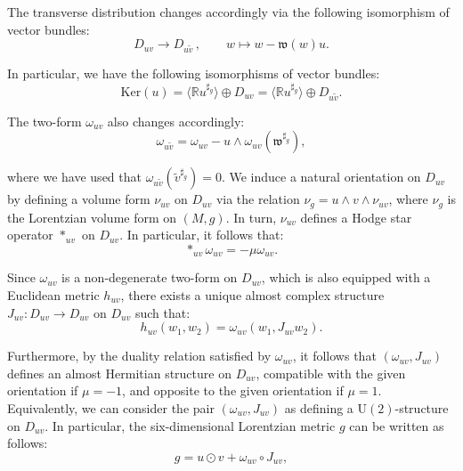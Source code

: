 \documentclass[10pt,a4paper,twoside,reqno]{amsart}
\theoremstyle{plain}
\theoremstyle{definition}
\theoremstyle{remark}
\def\U{\mathrm{U}}
\begin{document}
\noindent
The transverse distribution changes accordingly via the following isomorphism of vector bundles:
\begin{equation*}
D_{uv} \to D_{u\tilde{v}} \, , \qquad w \mapsto w - \mathfrak{w}(w) u.
\end{equation*}

\noindent
In particular, we have the following isomorphisms of vector bundles: 
\begin{equation*}
\mathrm{Ker}(u) =  \langle \mathbb{R} u^{\sharp_g} \rangle \oplus D_{uv} =  \langle \mathbb{R} u^{\sharp_g} \rangle \oplus D_{u\tilde{v}}.
\end{equation*}

\noindent
The two-form $\omega_{uv}$ also changes accordingly: 
\begin{equation*}
\omega_{u\tilde{v}} =\omega_{uv} -u\wedge\omega_{uv}(\mathfrak{w}^{\sharp_g}),
\end{equation*}

\noindent
where we have used that $\omega_{u\tilde{v}}(\tilde{v}^{\sharp_g})=0$. We induce a natural orientation on $D_{uv}$ by defining a volume form $\nu_{uv}$ on $D_{uv}$ via the relation $\nu_g =u\wedge v\wedge\nu_{uv}$, where $\nu_g$ is the Lorentzian volume form on $(M,g)$. In turn, $\nu_{uv}$ defines a Hodge star operator $*_{uv}$ on $D_{uv}$. In particular, it follows that: 
\begin{equation*}
\ast_{uv}\omega_{uv} = -\mu \omega_{uv}.
\end{equation*} 

\noindent
Since $\omega_{uv}$ is a non-degenerate two-form on $D_{uv}$, which is also equipped with a Euclidean metric $h_{uv}$, there exists a unique almost complex structure $J_{uv} \colon D_{uv} \to D_{uv}$ on $D_{uv}$ such that:
\begin{equation*}
h_{uv}(w_1 , w_2) = \omega_{uv}( w_1 , J_{uv} w_2).
\end{equation*}

\noindent
Furthermore, by the duality relation satisfied by $\omega_{uv}$, it follows that $(\omega_{uv},J_{uv})$ defines an almost Hermitian structure on $D_{uv}$, compatible with the given orientation if $\mu = -1$, and opposite to the given orientation if $\mu = 1$. Equivalently, we can consider the pair $(\omega_{uv},J_{uv})$ as defining a $\U(2)$-structure on $D_{uv}$. In particular, the six-dimensional Lorentzian metric $g$ can be written as follows:
\begin{equation*}
g = u\odot v + \omega_{uv} \circ J_{uv},
\end{equation*}
\end{document}
